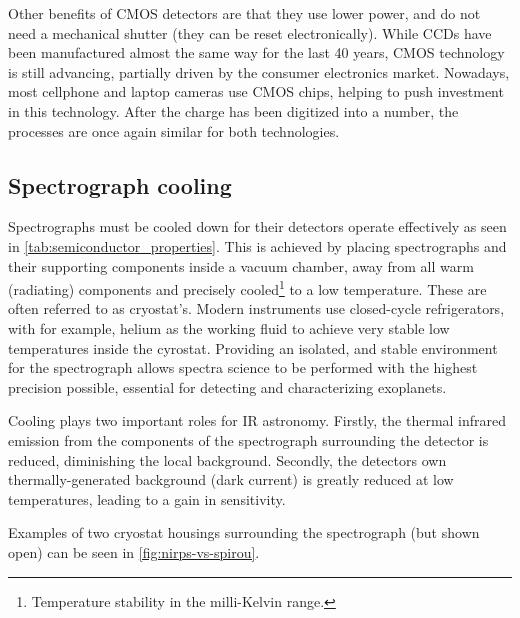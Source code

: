 Other benefits of {CMOS} detectors are that they use lower power, and do not need a mechanical shutter (they can be reset electronically).
While {CCDs} have been manufactured almost the same way for the last 40 years, {CMOS} technology is still advancing, partially driven by the consumer electronics market.
Nowadays, most cellphone and laptop cameras use {CMOS} chips, helping to push investment in this technology.
After the charge has been digitized into a number, the processes are once again similar for both technologies.

\subsection{Spectrograph cooling}
\label{subsec:cold_spectrogrpah}
Spectrographs must be cooled down for their detectors operate effectively as seen in \cref{tab:semiconductor_properties}.
This is achieved by placing spectrographs and their supporting components inside a vacuum chamber, away from all warm (radiating) components and precisely cooled\footnote{Temperature stability in the milli-Kelvin range.} to a low temperature.
These are often referred to as cryostat's.
Modern instruments use closed-cycle refrigerators, with for example, helium as the working fluid to achieve very stable low temperatures inside the cyrostat.
Providing an isolated, and stable environment for the spectrograph allows spectra science to be performed with the highest precision possible, essential for detecting and characterizing exoplanets.

Cooling plays two important roles for {IR} astronomy.
Firstly, the thermal infrared emission from the components of the spectrograph surrounding the detector is reduced, diminishing the local background.
Secondly, the detectors own thermally-generated background (dark current) is greatly reduced at low temperatures, leading to a gain in sensitivity.

Examples of two cryostat housings surrounding the spectrograph (but shown open) can be seen in \cref{fig:nirps-vs-spirou}.


